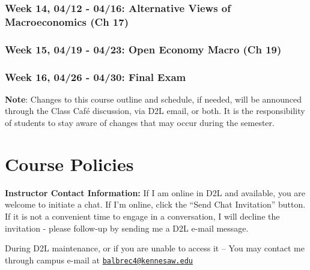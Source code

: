 \documentclass[11pt,]{article}
\begin{document}
\hypertarget{week-14-0412---0416-alternative-views-of-macroeconomics-ch-17}{%
\subsubsection*{Week 14, 04/12 - 04/16: Alternative Views of Macroeconomics (Ch 17)}\label{week-14-0412---0416-alternative-views-of-macroeconomics-ch-17}}

\hypertarget{week-15-0419---0423-open-economy-macro-ch-19}{%
\subsubsection*{Week 15, 04/19 - 04/23: Open Economy Macro (Ch 19)}\label{week-15-0419---0423-open-economy-macro-ch-19}}

\hypertarget{week-16-0426---0430-final-exam}{%
\subsubsection*{\texorpdfstring{Week 16, 04/26 - 04/30: \textbf{Final Exam}}{Week 16, 04/26 - 04/30: Final Exam}}\label{week-16-0426---0430-final-exam}}

\textbf{Note}: Changes to this course outline and schedule, if needed, will be announced through the Class Café
discussion, via D2L email, or both. It is the responsibility of students to stay aware of changes that may occur
during the semester.

\hypertarget{course-policies}{%
\section{Course Policies}\label{course-policies}}

\textbf{Instructor Contact Information:} If I am online in D2L and available, you are welcome to initiate a chat. If I'm
online, click the ``Send Chat Invitation'' button. If it is not a convenient time to engage in a conversation, I will
decline the invitation - please follow-up by sending me a D2L e-mail message.

During D2L maintenance, or if you are unable to access it -- You may contact me through campus e-mail at
\href{mailto:balbrec4@kennesaw.edu}{\nolinkurl{balbrec4@kennesaw.edu}}
\end{document}
